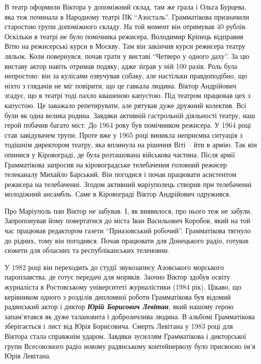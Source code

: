 В театр оформили Віктора у допоміжний склад, там же грала і Ольга Бурцева, яка
теж починала в Народному театрі ПК \enquote{Азосталь}. Грамматікова призначили
старостою групи допоміжного складу. На той момент він отримував 40 рублів.
Оскільки в театрі не було помічника режисера, Володимир Кріпець відправив Вітю
на режисерські курси в Москву. Там він закінчив курси режисера театру ляльок.
Коли повернувся, почав грати у виставі \enquote{Четверо у одного даху}. За цю виставу
актор навіть отримав подяку, адже зіграв у  ній 100 разів. Роль була непростою:
він за кулісами озвучував собаку, але настільки правдоподібно, що ніхто з
глядачів не міг повірити, що це гавкала людина. Віктор Андрійович згадує, що в
театрі тоді пахло квашеною капустою. Під театром працював цех з капустою. Це
заважало репетирувати, але рятував дуже дружний колектив. Всі були як одна
велика родина. Завдяки активній гастрольній діяльності театру, наш герой
побачив багато міст. До 1964 року був помічником режисера. У 1964 році став
завідувачем трупи. Проте вже у 1965 році виникла неприємна ситуація з тодішнім
директором театру, яка вплинула на рішення Віті – йти в армію. Так він опинися
у Кіровограді, де була розташована військова частина. Після армії Грамматікова
запросив на кіровоградське телебачення головний режисер телеканалу Михайло
Барський. Він погодися і почав працювати асистентом режисера на телебаченні.
Згодом активний маріуполець створив при телебаченні молодіжний ансамбль. Саме в
Кіровограді Віктор Андрійович одружився.

Про Маріуполь пан Віктор не забував. І, як виявилося, про нього теж не забули.
Запропонував йому повертатися до міста Іван Васильович Коробов, який на той час
працював редактором газети \enquote{Приазовський робочий}. Грамматікова тягнуло до
рідних, тому він погодився. Почав працювати для Донецького радіо, готував
сюжети для обласних та республіканських теленовин. 

У 1982 році він переходить до студії звукозапису Азовського морського
пароплавства, де готує передачі для моряків. Заочно Віктор здобув освіту
журналіста в Ростовському університеті журналістики (1984 рік). Цікаво, що
керівником одного з розділів дипломної роботи Грамматікова був відомий
радянський актор і диктор \emph{\textbf{Юрій Борисович Левітан}}, який нашому герою
запам'ятався як дуже талановита і доброзичлива людина. В альбомі Грамматікова
зберігається і лист від Юрія Борисовича. Смерть Левітана у 1983 році для
Віктора стала справжнім ударом. Завдяки зусиллям Грамматікова і дикторської
групи Всесоюзного радіо новому радянському контейнервозу було присвоєно ім'я
Юрія Левітана.

